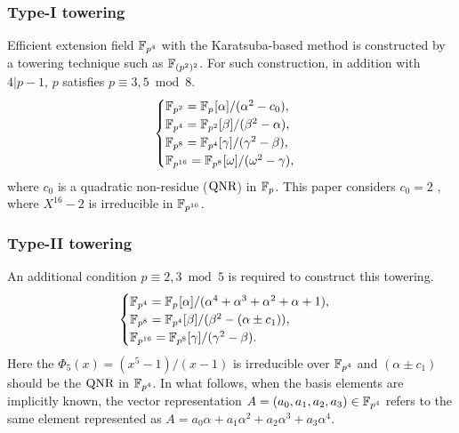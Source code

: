 \subsubsection{Type-I towering}
Efficient extension field $\mathbb{F}_{p^4}$ with the Karatsuba-based method is constructed by a towering technique such as $\mathbb{F}_{(p^2)^2}$. 
For such construction, in addition with $4|p-1$, $p$ satisfies $p \equiv 3, 5 \bmod 8$.  
\begin{equation}\label{towering_1}
\begin{cases}
{\mathbb{F}}_{p^{2}} = {\mathbb{F}}_{p^{}}[\alpha]/(\alpha^2-c_0),  \\ 
{\mathbb{F}}_{p^{4}} = {\mathbb{F}}_{p^{2}}[\beta]/(\beta^2-\alpha),  \\ 
{\mathbb{F}}_{p^{8}} = {\mathbb{F}}_{p^{4}}[\gamma]/(\gamma^2-\beta), \\ 
{\mathbb{F}}_{p^{16}} = {\mathbb{F}}_{p^{8}}[\omega]/(\omega^2-\gamma), \\ 
\end{cases}
\end{equation}
where  $c_0$ is a quadratic non-residue  ($\mbox{QNR}$) in ${\mathbb{F}}_{p}$. 
This paper considers  $c_0 = 2$ , where $X^{16}-2$ is irreducible in $\mathbb{F}_{p^{16}}$.

\subsubsection{Type-II towering}
An additional condition $p \equiv 2, 3 \bmod 5$ is required to construct this towering. 
\begin{equation}\label{towering_2}
\begin{cases}
{\mathbb{F}}_{p^{4}} = {\mathbb{F}}_{p^{}}[\alpha]/(\alpha^4+\alpha^3+\alpha^2+\alpha+1),  \\ 
{\mathbb{F}}_{p^{8}} = {\mathbb{F}}_{p^{4}}[\beta]/(\beta^2-(\alpha \pm c_1)),  \\ 
{\mathbb{F}}_{p^{16}} = {\mathbb{F}}_{p^{8}}[\gamma]/(\gamma^2-\beta). \\ 
\end{cases}
\end{equation}
Here the $\Phi_{5}(x) = (x^{5}-1)/(x-1)$ is irreducible over $\mathbb{F}_{p^4}$ and $(\alpha \pm c_1)$ should be the $\mbox{QNR}$ in $\mathbb{F}_{p^4}$.
In what follows, when the basis elements are implicitly known, the vector representation  $A=(a_0,a_1,a_2,a_3) \in \mathbb{F}_{p^4}$ refers to the same element represented as $A=a_0 \alpha+ a_1\alpha^2+ a_2\alpha^3+a_3\alpha^4$.

